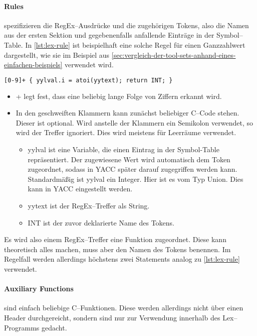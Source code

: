 \paragraph{Rules} spezifizieren die \ac{RegEx}--Ausdrücke und die zugehörigen Tokens, also die Namen aus der ersten Sektion und gegebenenfalls anfallende Einträge in der Symbol--Table.
In \autoref{lst:lex-rule} ist beispielhaft eine solche Regel für einen Ganzzahlwert dargestellt, wie sie im Beispiel aus \autoref{sec:vergleich-der-tool-sets-anhand-eines-einfachen-beispiels} verwendet wird.
\begin{lstlisting}[label={lst:lex-rule},caption={Lex Regel},language=lex]
[0-9]+ { yylval.i = atoi(yytext); return INT; }
\end{lstlisting}
\begin{itemize}
    \item {\ttfamily [0-9]+} legt fest, dass eine beliebig lange Folge von Ziffern erkannt wird.
    \item In den geschweiften Klammern kann zunächst beliebiger C--Code stehen.
    Dieser ist optional.
    Wird anstelle der Klammern ein Semikolon verwendet, so wird der Treffer ignoriert.
    Dies wird meistens für Leerräume verwendet.
    \begin{itemize}
        \item {\ttfamily yylval} ist eine Variable, die einen Eintrag in der Symbol-Table repräsentiert.
        Der zugewiesene Wert wird automatisch dem Token zugeordnet, sodass in \ac{YACC} später darauf zugegriffen werden kann.
        Standardmäßig ist {\ttfamily yylval} ein Integer.
        Hier ist es vom Typ Union.
        Dies kann in \ac{YACC} eingestellt werden.
        \item {\ttfamily yytext} ist der \acs{RegEx}--Treffer als String.
        \item {\ttfamily INT} ist der zuvor deklarierte Name des Tokens.
    \end{itemize}
\end{itemize}

Es wird also einem \ac{RegEx}--Treffer eine Funktion zugeordnet.
Diese kann theoretisch alles machen, muss aber den Namen des Tokens benennen.
Im Regelfall werden allerdings höchstens zwei Statements analog zu \autoref{lst:lex-rule} verwendet.

\paragraph{Auxiliary Functions} sind einfach beliebige C--Funktionen.
Diese werden allerdings nicht über einen Header durchgereicht, sondern sind nur zur Verwendung innerhalb des Lex--Programms gedacht.

